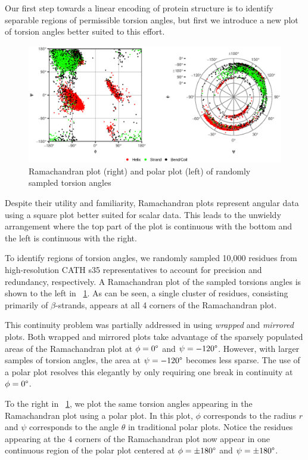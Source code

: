 \documentclass[a4,center,fleqn]{NAR}
\begin{document}
Our first step towards a linear encoding of protein structure is to identify separable regions of permissible torsion angles,
but first we introduce a new plot of torsion angles better suited to this effort. 

\begin{figure}[tb]
\centering
\includegraphics{combined_torsion}
\caption{Ramachandran plot (right) and polar plot (left) of randomly sampled torsion angles}
\label{fig:combined_torsion}
\end{figure}

Despite their utility and familiarity, Ramachandran plots \cite{Ramachandran1968} represent angular data using a square plot better suited for scalar data.
This leads to the unwieldy arrangement where the top part of the plot is continuous with the bottom and the left is continuous with the right. 

To identify regions of torsion angles, we randomly sampled 10,000 residues from high-resolution CATH s35 representatives to account for precision and redundancy, respectively. 
A Ramachandran plot of the sampled torsions angles is shown to the left in \figurename~\ref{fig:combined_torsion}. 
As can be seen, a single cluster of residues, consisting primarily of $\beta$-strands, appears at all 4 corners of the Ramachandran plot.

This continuity problem was partially addressed in \cite{Karplus2010} using \emph{wrapped} and \emph{mirrored} plots. 
Both wrapped and mirrored plots take advantage of the sparsely populated areas of the Ramachandran plot at $\phi = 0\degree$ and $\psi = -120\degree$.
However, with larger samples of torsion angles, the area at $\psi = -120\degree$ becomes less sparse. 
The use of a polar plot resolves this elegantly by only requiring one break in continuity at $\phi = 0\degree$. 

To the right in \figurename~\ref{fig:combined_torsion}, we plot the same torsion angles appearing in the Ramachandran plot using a polar plot. 
In this plot, $\phi$ corresponds to the radius $r$ and $\psi$ corresponds to the angle $\theta$ in traditional polar plots. 
Notice the residues appearing at the 4 corners of the Ramachandran plot now appear in one continuous region of the polar plot centered at $\phi = \pm180\degree$ and $\psi = \pm180\degree$. 
\end{document}
